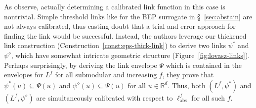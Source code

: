 \documentclass[twoside,11pt]{article}
\newcommand{\reals}{\mathbb{R}}
\newcommand{\ellabs}{\ell_{\text{abs}}^f}
\begin{document}
As \citeauthor{ourlovaszpaper} observe, actually determining a calibrated link function in this case is nontrivial.
Simple threshold links like for the BEP surrogate in \S~\ref{sec:abstain} are not always calibrated, thus casting doubt that a trial-and-error approach for finding the link would be successful.
Instead, the authors leverage our thickened link construction (Construction~\ref{const:eps-thick-link}) to derive two links $\psi^*$ and $\psi^\diamond$, which have somewhat intricate geometric structure (Figure~\ref{fig:lovasz-links}).
Perhaps surprisingly, by deriving the link envelope $\Psi$ which is contained in the envelopes for $L^f$ for all submodular and increasing $f$, they prove that $\psi^*(u) \subseteq \Psi(u)$ and $\psi^\diamond(u) \subseteq \Psi(u)$ for all $u \in \reals^d$.
Thus, both $(L^f, \psi^*)$ and $(L^f, \psi^\diamond)$ are simultaneously calibrated with respect to $\ellabs$ for all such $f$.
\end{document}
